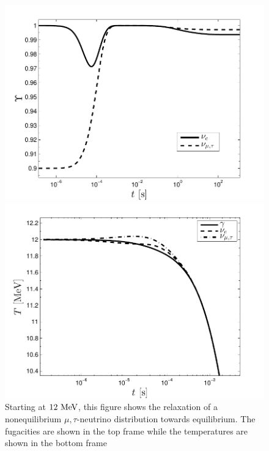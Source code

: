 \begin{figure} 
\centerline{\includegraphics[width=0.90\linewidth]{04-birrell/ParametricStudies/Figures/Ups_relax.pdf}}
\centerline{\includegraphics[width=0.90\linewidth]{04-birrell/ParametricStudies/Figures/T_relax.pdf}}
\caption{Starting at $12\text{ MeV}$, this figure shows the relaxation of a nonequilibrium $\mu,\tau$-neutrino distribution towards equilibrium. The fugacities are shown in the top frame while the temperatures are shown in the bottom frame}
\label{fig:relax}
 \end{figure}

